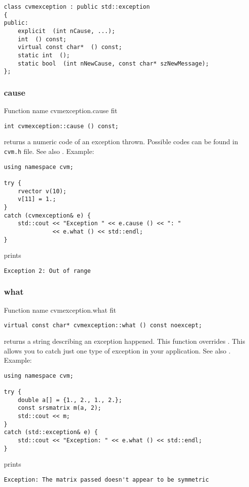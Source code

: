 \bigskip
\noindent
\verb"class cvmexception : public std::exception"\\
\verb"{"\\
\verb"public:"\\
\verb"    explicit "\verb" (int nCause, ...);"\\
\verb"    int "\verb" () const;"\\
\verb"    virtual const char* "\verb" () const;"\\
\verb"    static int "\verb" ();"\\
\verb"    static bool "\verb" (int nNewCause, const char* szNewMessage);"\\
\verb"};"
\newpage



\subsubsection{cause}
Function%
\pdfdest name {cvmexception.cause} fit
\begin{verbatim}
int cvmexception::cause () const;
\end{verbatim}
returns a numeric code of an exception thrown.
Possible codes can be found in \verb"cvm.h" file.
See also .
Example:
\begin{Verbatim}
using namespace cvm;

try {
    rvector v(10);
    v[11] = 1.;
}
catch (cvmexception& e) {
    std::cout << "Exception " << e.cause () << ": " 
              << e.what () << std::endl;
}
\end{Verbatim}
prints
\begin{Verbatim}
Exception 2: Out of range
\end{Verbatim}
\newpage



\subsubsection{what}
Function%
\pdfdest name {cvmexception.what} fit
\begin{verbatim}
virtual const char* cvmexception::what () const noexcept;
\end{verbatim}
returns a string describing an exception happened.
This function overrides .
This allows you to catch just one type of exception
in your application.
See also .
Example:
\begin{Verbatim}
using namespace cvm;

try {
    double a[] = {1., 2., 1., 2.};
    const srsmatrix m(a, 2);
    std::cout << m;
}
catch (std::exception& e) {
    std::cout << "Exception: " << e.what () << std::endl;
}
\end{Verbatim}
prints
\begin{Verbatim}
Exception: The matrix passed doesn't appear to be symmetric
\end{Verbatim}
\newpage



